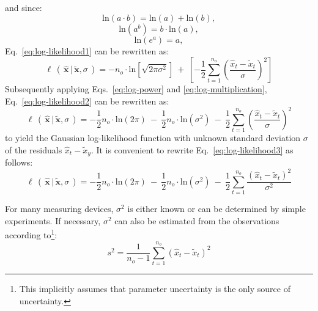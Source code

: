 and since:
\begin{equation}\label{eq:log-multiplication}
\mathrm{ln}\left(a\cdot{}b\right) = \mathrm{ln}\left(a\right) + \mathrm{ln}\left(b\right),
\end{equation}
\begin{equation}\label{eq:log-power}
\mathrm{ln}\left(a^b\right) = b \cdot \mathrm{ln}\left(a\right),
\end{equation}
\begin{equation}
\mathrm{ln}\left(e^a\right) = a,
\end{equation}
Eq.~\ref{eq:log-likelihood1} can be rewritten as:
\begin{equation}\label{eq:log-likelihood2}
\ell\,(\,\hat{\mathbf{x}}\,|\,\tilde{\mathbf{x}},\sigma\,) = -n_o \cdot{} \mathrm{ln}\left[\sqrt{2\pi\sigma^2}\right]\:+\:\left[-\frac{1}{2}\sum_{t=1}^{n_o}\left(\frac{\hat{x}_t-\tilde{x}_t}{\sigma}\right)^2\right]
\end{equation}
Subsequently applying Eqs.~\ref{eq:log-power} and \ref{eq:log-multiplication}, Eq.~\ref{eq:log-likelihood2} can be rewritten as:
\begin{equation}\label{eq:log-likelihood3}
\ell\,(\,\hat{\mathbf{x}}\,|\,\tilde{\mathbf{x}},\sigma\,) = -\frac{1}{2}n_o\cdot{}\mathrm{ln}\left(2\pi\right)\:-\:\frac{1}{2}n_o\cdot{}\mathrm{ln}\left(\sigma^2\right)\:-\:\frac{1}{2}\sum_{t=1}^{n_o}\left(\frac{\hat{x}_t-\tilde{x}_t}{\sigma}\right)^2
\end{equation}
to yield the Gaussian log-likelihood function with unknown standard deviation $\sigma$ of the residuals $\hat{x}_t-\tilde{x}_y$. It is convenient to rewrite Eq.~\ref{eq:log-likelihood3} as follows:
\begin{equation}\label{eq:log-likelihood4}
\ell\,(\,\hat{\mathbf{x}}\,|\,\tilde{\mathbf{x}},\sigma\,) = -\frac{1}{2}n_o\cdot{}\mathrm{ln}\left(2\pi\right)\:-\:\frac{1}{2}n_o\cdot{}\mathrm{ln}\left(\sigma^2\right)\:-\:\frac{1}{2}\sum_{t=1}^{n_o}\frac{\left(\hat{x}_t-\tilde{x}_t\right)^2}{\sigma^2}
\end{equation}

For many measuring devices, $\sigma^2$ is either known or can be determined by simple experiments. If necessary, $\sigma^2$ can also be estimated from the observations according to\footnote{This implicitly assumes that parameter uncertainty is the only source of uncertainty.}:
\begin{equation}\label{eq:variance-estimator}
s^2 = \frac{1}{n_o-1}\sum_{t=1}^{n_o}\left(\hat{x}_t-\tilde{x}_t\right)^2
\end{equation}

